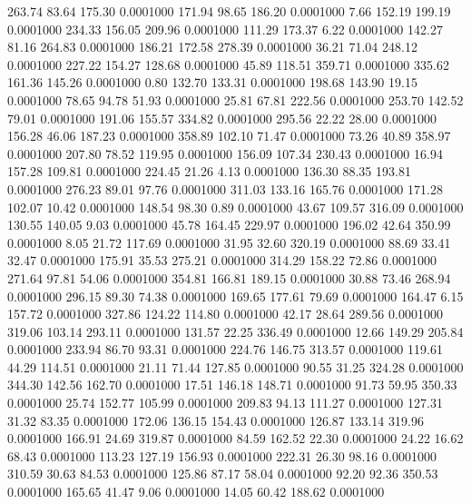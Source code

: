  263.74   83.64  175.30   0.0001000
 171.94   98.65  186.20   0.0001000
   7.66  152.19  199.19   0.0001000
 234.33  156.05  209.96   0.0001000
 111.29  173.37    6.22   0.0001000
 142.27   81.16  264.83   0.0001000
 186.21  172.58  278.39   0.0001000
  36.21   71.04  248.12   0.0001000
 227.22  154.27  128.68   0.0001000
  45.89  118.51  359.71   0.0001000
 335.62  161.36  145.26   0.0001000
   0.80  132.70  133.31   0.0001000
 198.68  143.90   19.15   0.0001000
  78.65   94.78   51.93   0.0001000
  25.81   67.81  222.56   0.0001000
 253.70  142.52   79.01   0.0001000
 191.06  155.57  334.82   0.0001000
 295.56   22.22   28.00   0.0001000
 156.28   46.06  187.23   0.0001000
 358.89  102.10   71.47   0.0001000
  73.26   40.89  358.97   0.0001000
 207.80   78.52  119.95   0.0001000
 156.09  107.34  230.43   0.0001000
  16.94  157.28  109.81   0.0001000
 224.45   21.26    4.13   0.0001000
 136.30   88.35  193.81   0.0001000
 276.23   89.01   97.76   0.0001000
 311.03  133.16  165.76   0.0001000
 171.28  102.07   10.42   0.0001000
 148.54   98.30    0.89   0.0001000
  43.67  109.57  316.09   0.0001000
 130.55  140.05    9.03   0.0001000
  45.78  164.45  229.97   0.0001000
 196.02   42.64  350.99   0.0001000
   8.05   21.72  117.69   0.0001000
  31.95   32.60  320.19   0.0001000
  88.69   33.41   32.47   0.0001000
 175.91   35.53  275.21   0.0001000
 314.29  158.22   72.86   0.0001000
 271.64   97.81   54.06   0.0001000
 354.81  166.81  189.15   0.0001000
  30.88   73.46  268.94   0.0001000
 296.15   89.30   74.38   0.0001000
 169.65  177.61   79.69   0.0001000
 164.47    6.15  157.72   0.0001000
 327.86  124.22  114.80   0.0001000
  42.17   28.64  289.56   0.0001000
 319.06  103.14  293.11   0.0001000
 131.57   22.25  336.49   0.0001000
  12.66  149.29  205.84   0.0001000
 233.94   86.70   93.31   0.0001000
 224.76  146.75  313.57   0.0001000
 119.61   44.29  114.51   0.0001000
  21.11   71.44  127.85   0.0001000
  90.55   31.25  324.28   0.0001000
 344.30  142.56  162.70   0.0001000
  17.51  146.18  148.71   0.0001000
  91.73   59.95  350.33   0.0001000
  25.74  152.77  105.99   0.0001000
 209.83   94.13  111.27   0.0001000
 127.31   31.32   83.35   0.0001000
 172.06  136.15  154.43   0.0001000
 126.87  133.14  319.96   0.0001000
 166.91   24.69  319.87   0.0001000
  84.59  162.52   22.30   0.0001000
  24.22   16.62   68.43   0.0001000
 113.23  127.19  156.93   0.0001000
 222.31   26.30   98.16   0.0001000
 310.59   30.63   84.53   0.0001000
 125.86   87.17   58.04   0.0001000
  92.20   92.36  350.53   0.0001000
 165.65   41.47    9.06   0.0001000
  14.05   60.42  188.62   0.0001000

